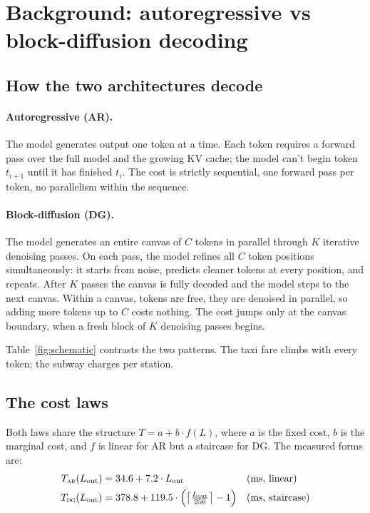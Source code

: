 \section{Background: autoregressive vs block-diffusion decoding}
\label{sec:laws}

\subsection{How the two architectures decode}

\paragraph{Autoregressive (AR).}
The model generates output one token at a time. Each token requires a
forward pass over the full model and the growing KV cache; the model
can't begin token $t_{i+1}$ until it has finished $t_i$. The cost is
strictly sequential, one forward pass per token, no parallelism
within the sequence.

\paragraph{Block-diffusion (DG).}
The model generates an entire canvas of $C$ tokens in parallel
through $K$ iterative denoising passes. On each pass, the model
refines all $C$ token positions simultaneously: it starts from noise,
predicts cleaner tokens at every position, and repeats. After $K$
passes the canvas is fully decoded and the model steps to the next
canvas. Within a canvas, tokens are free, they are denoised in
parallel, so adding more tokens up to $C$ costs nothing. The cost
jumps only at the canvas boundary, when a fresh block of $K$ denoising
passes begins.

Table~\ref{fig:schematic} contrasts the two patterns. The taxi fare
climbs with every token; the subway charges per station.

\subsection{The cost laws}

Both laws share the structure $T = a + b \cdot f(L)$, where $a$ is the
fixed cost, $b$ is the marginal cost, and $f$ is linear for AR but a
staircase for DG. The measured forms are:
\begin{align}
\label{eq:ar}
T_{\textsc{ar}}(L_{\mathrm{out}}) &= 34.6 + 7.2 \cdot L_{\mathrm{out}} && \text{(ms, linear)} \\
\label{eq:dg}
T_{\textsc{dg}}(L_{\mathrm{out}}) &= 378.8 + 119.5 \cdot \Bigl(\bigl\lceil \tfrac{L_{\mathrm{out}}}{256}\bigr\rceil - 1\Bigr) && \text{(ms, staircase)}
\end{align}

